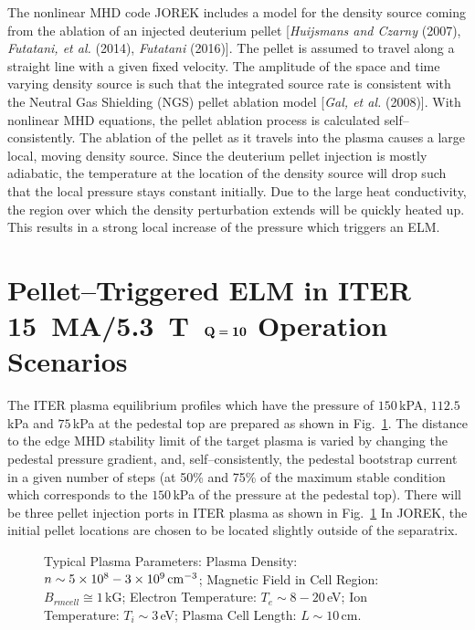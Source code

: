 \documentclass[a4paper,openany,12pt]{book}
\begin{document}
{The nonlinear MHD code JOREK includes a model for the density source coming from the ablation of an injected deuterium pellet [\emph{Huijsmans and Czarny} (2007), \emph{Futatani, et al.} (2014), \emph{Futatani} (2016)]. The pellet is assumed to travel along a straight line with a given fixed velocity. The amplitude of the space and time varying density source is such that the integrated source rate is consistent with the Neutral Gas Shielding (NGS) pellet ablation model [\emph{Gal, et al.} (2008)]. With nonlinear MHD equations, the pellet ablation process is calculated self--consistently. The ablation of the pellet as it travels into the plasma causes a large local, moving density source. Since the deuterium pellet injection is mostly adiabatic, the temperature at the location of the density source will drop such that the local pressure stays constant initially. Due to the large heat conductivity, the region over which the density perturbation extends will be quickly heated up. This results in a strong local increase of the pressure which triggers an ELM.

\section{Pellet--Triggered ELM in ITER {\bf 15~MA/5.3~T}\ ${\bf Q=10}$ Operation Scenarios}

The ITER plasma equilibrium profiles which have the pressure of $150\,$kPA, 
$112.5\,$kPa and $75\,$kPa at the pedestal top are prepared as shown in Fig.~\ref{Typical}. The distance to the edge MHD stability limit of the target plasma is varied by changing the pedestal pressure gradient, and, self--consistently, the pedestal bootstrap current in a given number of steps (at 50\% and 75\% of the maximum stable condition which corresponds to the $150\,$kPa of the pressure at the pedestal top). There will be three pellet injection ports in ITER plasma as shown in Fig.~\ref{Typical} In JOREK, the initial pellet locations are chosen to be located slightly outside of the separatrix.
%
\begin{figure}[H]
\centerline{}
\caption{Typical Plasma Parameters: Plasma Density: $n\sim 5\times 10^8-3\times 10^9\,\rm cm^{-3}$; Magnetic Field in Cell Region: $B_{rm cell}\cong 1\,$kG; Electron Temperature: $T_e\sim 8-20\,$eV; Ion Temperature: $T_i\sim 3\,$eV; Plasma Cell Length: $L\sim 10\,$cm.}
\label{Typical}
\end{figure}
%

}
\end{document}
